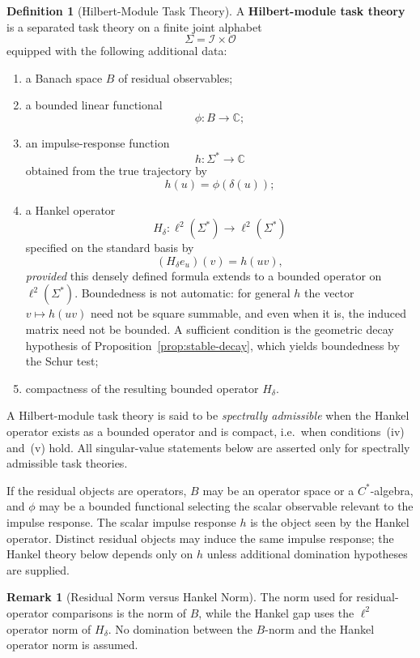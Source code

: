 \documentclass[12pt]{article}
\theoremstyle{definition}
\newtheorem{definition}[theorem]{Definition}
\newtheorem{remark}[theorem]{Remark}
\begin{document}
\begin{definition}[Hilbert-Module Task Theory]
\label{def:hilbert-module}
A \textbf{Hilbert-module task theory} is a separated task theory on a finite
joint alphabet
\[
\Sigma=\mathcal I\times\mathcal O
\]
equipped with the following additional data:
\begin{enumerate}[label=(\arabic*)]
\item a Banach space $B$ of residual observables;
\item a bounded linear functional
\[
\phi:B\to\mathbb C;
\]
\item an impulse-response function
\[
h:\Sigma^*\to\mathbb C
\]
obtained from the true trajectory by
\[
h(u)=\phi(\delta(u));
\]
\item a Hankel operator
\[
H_\delta:\ell^2(\Sigma^*)\to\ell^2(\Sigma^*)
\]
specified on the standard basis by
\[
(H_\delta e_u)(v)=h(uv),
\]
\emph{provided} this densely defined formula extends to a bounded operator on
$\ell^2(\Sigma^*)$.  Boundedness is not automatic: for general $h$ the vector
$v\mapsto h(uv)$ need not be square summable, and even when it is, the induced
matrix need not be bounded.  A sufficient condition is the geometric decay
hypothesis of Proposition~\ref{prop:stable-decay}, which yields boundedness by
the Schur test;
\item compactness of the resulting bounded operator $H_\delta$.
\end{enumerate}
A Hilbert-module task theory is said to be \emph{spectrally admissible} when
the Hankel operator exists as a bounded operator and is compact, i.e.\ when
conditions~(iv) and~(v) hold.  All singular-value statements below are
asserted only for spectrally admissible task theories.
\end{definition}

If the residual objects are operators, $B$ may be an operator space or a
$C^*$-algebra, and $\phi$ may be a bounded functional selecting the scalar
observable relevant to the impulse response.  The scalar impulse response $h$
is the object seen by the Hankel operator.  Distinct residual objects may
induce the same impulse response; the Hankel theory below depends only on $h$
unless additional domination hypotheses are supplied.

\begin{remark}[Residual Norm versus Hankel Norm]
\label{rem:hilbert-residual-hankel}
The norm used for residual-operator comparisons is the norm of $B$, while the
Hankel gap uses the $\ell^2$ operator norm of $H_\delta$.  No domination
between the $B$-norm and the Hankel operator norm is assumed.
\end{remark}
\end{document}
